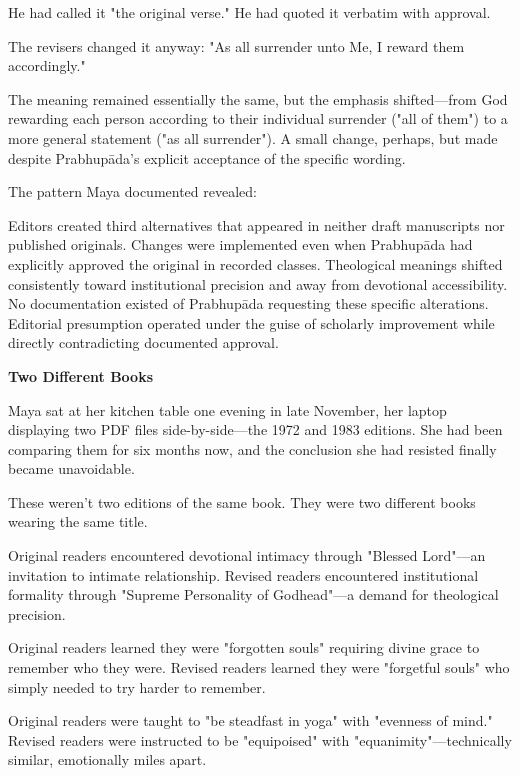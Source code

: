 \documentclass[12pt,twoside]{book}
\begin{document}
He had called it "the original verse." He had quoted it verbatim with approval.

The revisers changed it anyway: "As all surrender unto Me, I reward them accordingly."

The meaning remained essentially the same, but the emphasis shifted—from God rewarding each person according to their individual surrender ("all of them") to a more general statement ("as all surrender"). A small change, perhaps, but made despite Prabhupāda's explicit acceptance of the specific wording.

The pattern Maya documented revealed:

Editors created third alternatives that appeared in neither draft manuscripts nor published originals. Changes were implemented even when Prabhupāda had explicitly approved the original in recorded classes. Theological meanings shifted consistently toward institutional precision and away from devotional accessibility. No documentation existed of Prabhupāda requesting these specific alterations. Editorial presumption operated under the guise of scholarly improvement while directly contradicting documented approval.


\vspace{0.5cm}
\textbf{Two Different Books}
\vspace{0.2cm}


Maya sat at her kitchen table one evening in late November, her laptop displaying two PDF files side-by-side—the 1972 and 1983 editions. She had been comparing them for six months now, and the conclusion she had resisted finally became unavoidable.

These weren't two editions of the same book. They were two different books wearing the same title.

Original readers encountered devotional intimacy through "Blessed Lord"—an invitation to intimate relationship. Revised readers encountered institutional formality through "Supreme Personality of Godhead"—a demand for theological precision.

Original readers learned they were "forgotten souls" requiring divine grace to remember who they were. Revised readers learned they were "forgetful souls" who simply needed to try harder to remember.

Original readers were taught to "be steadfast in yoga" with "evenness of mind." Revised readers were instructed to be "equipoised" with "equanimity"—technically similar, emotionally miles apart.
\end{document}
